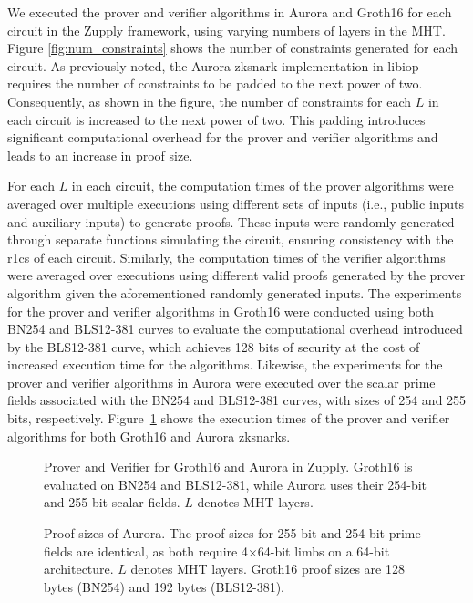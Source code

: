 We executed the prover and verifier algorithms in Aurora and Groth16 for each circuit in the Zupply framework, using varying numbers of layers in the \textsf{MHT}. Figure \ref{fig:num_constraints} shows the number of constraints generated for each circuit. As previously noted, the Aurora \gls{zksnark} implementation in libiop \cite{libiop} requires the number of constraints to be padded to the next power of two. Consequently, as shown in the figure, the number of constraints for each $L$ in each circuit is increased to the next power of two. This padding introduces significant computational overhead for the prover and verifier algorithms and leads to an increase in proof size.


For each $L$ in each circuit, the computation times of the prover algorithms were averaged over multiple executions using different sets of inputs (i.e., public inputs and auxiliary inputs) to generate proofs. These inputs were randomly generated through  separate functions simulating the circuit, ensuring consistency with the \gls{r1cs} of each circuit. Similarly, the computation times of the verifier algorithms were averaged over executions using different valid proofs generated by the prover algorithm given the aforementioned randomly generated inputs. 
The experiments for the prover and verifier algorithms in Groth16 were conducted using both BN254 and BLS12-381 curves to evaluate the computational overhead introduced by the BLS12-381 curve, which achieves 128 bits of security at the cost of increased execution time for the algorithms. Likewise, the experiments for the prover and verifier algorithms in Aurora were executed over the scalar prime fields associated with the BN254 and BLS12-381 curves, with sizes of 254 and 255 bits, respectively. Figure~\ref{fig:execution_time} shows the execution times of the prover and verifier algorithms for both Groth16 and Aurora \gls{zksnark}s.

\begin{figure}
    \centering
    \scalebox{0.81}{
    
    }
    \caption[The runtime of the prover and verifier algorithms in Zupply]{Prover and Verifier for Groth16 and Aurora in Zupply. Groth16 is evaluated on BN254 and BLS12-381, while Aurora uses their 254-bit and 255-bit scalar fields. $L$ denotes \textsf{MHT} layers.}

    \label{fig:execution_time}
\end{figure}

\begin{figure}
    \centering
    \scalebox{0.85}{
    
    }
    \caption[The proof sizes in Zupply based on Aurora]{Proof sizes of Aurora. The proof sizes for 255-bit and 254-bit prime fields are identical, as both require 4×64-bit limbs on a 64-bit architecture. $L$ denotes \textsf{MHT} layers.  Groth16 proof sizes are 128 bytes (BN254) and 192 bytes (BLS12-381). }
    \label{fig:proof_size}
\end{figure}


